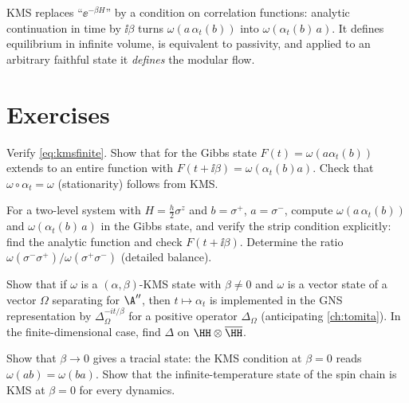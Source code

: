 \begin{keyidea}
KMS replaces ``$\ee^{-\beta H}$'' by a condition on correlation functions: analytic continuation in time by $\ii\beta$ turns $\omega(a\,\alpha_t(b))$ into $\omega(\alpha_t(b)\,a)$. It defines equilibrium in infinite volume, is equivalent to passivity, and applied to an arbitrary faithful state it \emph{defines} the modular flow.
\end{keyidea}

\section*{Exercises}
\begin{exercise}
Verify \eqref{eq:kmsfinite}. Show that for the Gibbs state $F(t)=\omega(a\alpha_t(b))$ extends to an entire function with $F(t+\ii\beta)=\omega(\alpha_t(b)a)$. Check that $\omega\circ\alpha_t=\omega$ (stationarity) follows from KMS.
\end{exercise}
\begin{exercise}
For a two-level system with $H=\frac h2\sigma^z$ and $b=\sigma^+$, $a=\sigma^-$, compute $\omega(a\,\alpha_t(b))$ and $\omega(\alpha_t(b)\,a)$ in the Gibbs state, and verify the strip condition explicitly: find the analytic function and check $F(t+\ii\beta)$. Determine the ratio $\omega(\sigma^-\sigma^+)/\omega(\sigma^+\sigma^-)$ (detailed balance).
\end{exercise}
\begin{exercise}
Show that if $\omega$ is a $(\alpha,\beta)$-KMS state with $\beta\ne0$ and $\omega$ is a vector state of a vector $\Omega$ separating for $\A''$, then $t\mapsto\alpha_t$ is implemented in the GNS representation by $\Delta_\Omega^{-it/\beta}$ for a positive operator $\Delta_\Omega$ (anticipating \cref{ch:tomita}). In the finite-dimensional case, find $\Delta$ on $\HH\otimes\overline\HH$.
\end{exercise}
\begin{exercise}
Show that $\beta\to0$ gives a tracial state: the KMS condition at $\beta=0$ reads $\omega(ab)=\omega(ba)$. Show that the infinite-temperature state of the spin chain is KMS at $\beta=0$ for every dynamics.
\end{exercise}
